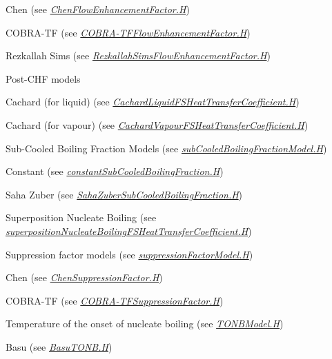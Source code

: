 \begin{DoxyItemize}
\begin{DoxyItemize}
\begin{DoxyItemize}
\begin{DoxyItemize}
\item Chen (see {\itshape \hyperlink{ChenFlowEnhancementFactor_8H}{Chen\+Flow\+Enhancement\+Factor.\+H}}) 
\item C\+O\+B\+R\+A-\/\+TF (see {\itshape \hyperlink{COBRA-TFFlowEnhancementFactor_8H}{C\+O\+B\+R\+A-\/\+T\+F\+Flow\+Enhancement\+Factor.\+H}}) 
\item Rezkallah Sims (see {\itshape \hyperlink{RezkallahSimsFlowEnhancementFactor_8H}{Rezkallah\+Sims\+Flow\+Enhancement\+Factor.\+H}}) 
\end{DoxyItemize}
\item Post-\/\+C\+HF models 
\begin{DoxyItemize}
\item Cachard (for liquid) (see {\itshape \hyperlink{CachardLiquidFSHeatTransferCoefficient_8H}{Cachard\+Liquid\+F\+S\+Heat\+Transfer\+Coefficient.\+H}}) 
\item Cachard (for vapour) (see {\itshape \hyperlink{CachardVapourFSHeatTransferCoefficient_8H}{Cachard\+Vapour\+F\+S\+Heat\+Transfer\+Coefficient.\+H}}) 
\end{DoxyItemize}
\item Sub-\/\+Cooled Boiling Fraction Models (see {\itshape \hyperlink{subCooledBoilingFractionModel_8H}{sub\+Cooled\+Boiling\+Fraction\+Model.\+H}}) 
\begin{DoxyItemize}
\item Constant (see {\itshape \hyperlink{constantSubCooledBoilingFraction_8H}{constant\+Sub\+Cooled\+Boiling\+Fraction.\+H}}) 
\item Saha Zuber (see {\itshape \hyperlink{SahaZuberSubCooledBoilingFraction_8H}{Saha\+Zuber\+Sub\+Cooled\+Boiling\+Fraction.\+H}}) 
\end{DoxyItemize}
\item Superposition Nucleate Boiling (see {\itshape \hyperlink{superpositionNucleateBoilingFSHeatTransferCoefficient_8H}{superposition\+Nucleate\+Boiling\+F\+S\+Heat\+Transfer\+Coefficient.\+H}}) 
\item Suppression factor models (see {\itshape \hyperlink{suppressionFactorModel_8H}{suppression\+Factor\+Model.\+H}}) 
\begin{DoxyItemize}
\item Chen (see {\itshape \hyperlink{ChenSuppressionFactor_8H}{Chen\+Suppression\+Factor.\+H}}) 
\item C\+O\+B\+R\+A-\/\+TF (see {\itshape \hyperlink{COBRA-TFSuppressionFactor_8H}{C\+O\+B\+R\+A-\/\+T\+F\+Suppression\+Factor.\+H}}) 
\end{DoxyItemize}
\item Temperature of the onset of nucleate boiling (see {\itshape \hyperlink{TONBModel_8H}{T\+O\+N\+B\+Model.\+H}}) 
\begin{DoxyItemize}
\item Basu (see {\itshape \hyperlink{BasuTONB_8H}{Basu\+T\+O\+N\+B.\+H}}) 
\end{DoxyItemize}
\end{DoxyItemize}
\end{DoxyItemize}
\end{DoxyItemize}~\newline
 

